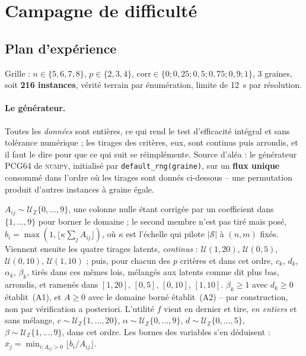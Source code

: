 \documentclass[11pt,a4paper]{article}
\theoremstyle{plain}
\theoremstyle{remark}
\newcommand{\Scal}{\mathcal{S}}
\begin{document}
\section{Campagne de difficulté}
\label{sec:campagne}

\subsection{Plan d'expérience}

Grille : $n\in\{5,6,7,8\}$, $p\in\{2,3,4\}$,
$\text{corr}\in\{0;0{,}25;0{,}5;0{,}75;0{,}9;1\}$, 3 graines, soit
\textbf{216 instances}, vérité terrain par énumération, limite de 12~s par
résolution.

\paragraph{Le générateur.} Toutes les \emph{données} sont entières, ce qui
rend le test d'efficacité intégral et sans tolérance numérique ; les tirages
des critères, eux, sont continus puis arrondis, et il faut le dire pour que
ce qui suit se réimplémente. Source d'aléa :
le générateur PCG64 de \textsc{numpy}, initialisé par \texttt{default\_rng(graine)}, sur un
\textbf{flux unique} consommé dans l'ordre où les tirages sont donnés
ci-dessous -- une permutation produit d'autres instances à graine égale.

$A_{ij}\sim\mathcal{U}_{\mathbb{Z}}\{0,\dots,9\}$, une colonne nulle étant
corrigée par un coefficient dans $\{1,\dots,9\}$ pour borner le domaine ; le
second membre n'est pas tiré mais posé,
$b_i=\max(1,\lfloor\kappa\sum_j A_{ij}\rfloor)$, où $\kappa$ est l'échelle
qui pilote $|\Scal|$ à $(n,m)$ fixés. Viennent ensuite les quatre tirages
latents, \emph{continus} : $\mathcal{U}(1,20)$, $\mathcal{U}(0,5)$,
$\mathcal{U}(0,10)$, $\mathcal{U}(1,10)$ ; puis, pour chacun des $p$
critères et dans cet ordre, $c_k$, $d_k$, $\alpha_k$, $\beta_k$, tirés dans
ces mêmes lois, mélangés aux latents comme dit plus bas, arrondis, et
ramenés dans $[1,20]$, $[0,5]$, $[0,10]$, $[1,10]$. $\beta_k\ge 1$ avec
$d_k\ge 0$ établit~(A1), et $A\ge 0$ avec le domaine borné établit~(A2) --
par construction, non par vérification a posteriori. L'utilité $f$ vient en
dernier et tire, \emph{en entiers} et sans mélange,
$c\sim\mathcal{U}_{\mathbb{Z}}\{1,\dots,20\}$,
$\alpha\sim\mathcal{U}_{\mathbb{Z}}\{0,\dots,9\}$,
$d\sim\mathcal{U}_{\mathbb{Z}}\{0,\dots,5\}$,
$\beta\sim\mathcal{U}_{\mathbb{Z}}\{1,\dots,9\}$, dans cet ordre. Les
bornes des variables s'en déduisent :
$\overline{x}_j=\min_{i:A_{ij}>0}\lfloor b_i/A_{ij}\rfloor$.
\end{document}
